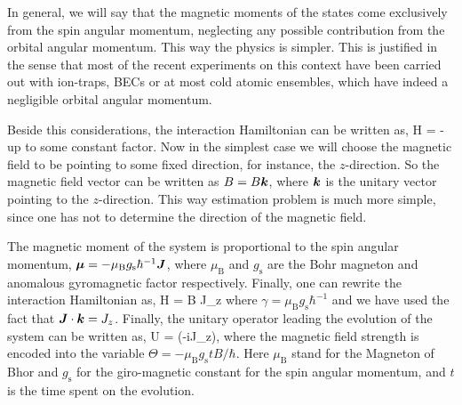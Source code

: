In general, we will say that the magnetic moments of the states come exclusively from the spin angular momentum, neglecting any possible contribution from the orbital angular momentum.
This way the physics is simpler.
This is justified in the sense that most of the recent experiments on this context have been carried out with ion-traps, BECs or at most cold atomic ensembles, which have indeed a negligible orbital angular momentum.

Beside this considerations, the interaction Hamiltonian can be written as,
\be
  H = - \bs{\mu} \cdot {}
\ee
up to some constant factor.
Now in the simplest case we will choose the magnetic field to be pointing to some fixed direction, for instance, the $z$-direction.
So the magnetic field vector can be written as ${B}=B\boldsymbol{k}$, where $\boldsymbol{k}$ is the unitary vector pointing to the $z$-direction.
This way estimation problem is much more simple, since one has not to determine the direction of the magnetic field.

The magnetic moment of the system is proportional to the spin angular momentum, $\boldsymbol{\mu}=-\mu_\text{B} g_{\text{s}}\hbar^{-1} \boldsymbol{J}$, where $\mu_{\text{B}}$ and $g_{\text{s}}$ are the Bohr magneton and anomalous gyromagnetic factor respectively.
Finally, one can rewrite the interaction Hamiltonian as,
\be
  H = \gamma B J_z
\ee
where $\gamma = \mu_\text{B} g_{\text{s}}\hbar^{-1}$ and we have used the fact that $\boldsymbol{J}\cdot\boldsymbol{k}=J_z$.
Finally, the unitary operator leading the evolution of the system can be written as,
\be
  U = \exp(-i\Theta J_z),
\ee
where the magnetic field strength is encoded into the variable $\Theta=-\mu_\text{B} g_\text{s} t B/\hbar$.
Here $\mu_\text{B}$ stand for the Magneton of Bhor and $g_\text{s}$ for the giro-magnetic constant for the spin angular momentum, and $t$ is the time spent on the evolution.
